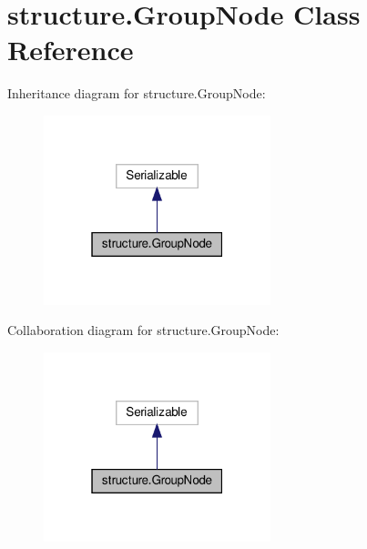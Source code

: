 \hypertarget{classstructure_1_1_group_node}{}\section{structure.\+Group\+Node Class Reference}
\label{classstructure_1_1_group_node}


Inheritance diagram for structure.\+Group\+Node\+:
\nopagebreak
\begin{figure}[H]
\begin{center}
\leavevmode
\includegraphics[width=187pt]{classstructure_1_1_group_node__inherit__graph}
\end{center}
\end{figure}


Collaboration diagram for structure.\+Group\+Node\+:
\nopagebreak
\begin{figure}[H]
\begin{center}
\leavevmode
\includegraphics[width=187pt]{classstructure_1_1_group_node__coll__graph}
\end{center}
\end{figure}
